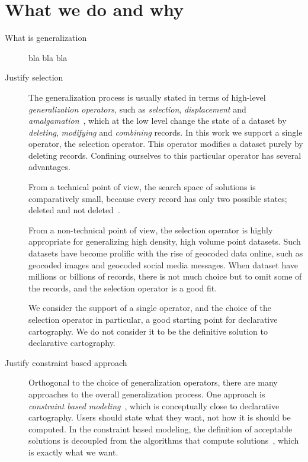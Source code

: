 \documentclass[11pt, oneside]{article}   	%
\begin{document}
\section{What we do and why}

\begin{description}


\item[What is generalization] bla bla bla

\item[Justify selection] The generalization process is usually stated in terms of high-level \emph{generalization operators}, such as \emph{selection}, \emph{displacement} and \emph{amalgamation}~\cite{weibel1999generalising}, which at the low level change the state of a dataset by \emph{deleting}, \emph{modifying} and \emph{combining} records. In this work we support a single operator, the selection operator. This operator modifies a dataset purely by deleting records. Confining ourselves to this particular operator has several advantages. 

From a technical point of view, the search space of solutions is comparatively small,  because every record has only two possible states; deleted and not deleted~\cite{harrie2007modelling}.

From a non-technical point of view, the selection operator is highly appropriate for generalizing high density, high volume point datasets. Such datasets have become prolific with the rise of geocoded data online, such as geocoded images and geocoded social media messages. When dataset have millions or billions of records, there is not much choice but to omit some of the records, and the selection operator is a good fit.

We consider the support of a single operator, and the choice of the selection operator in particular, a good starting point for declarative cartography. We do not consider it to be the definitive solution to declarative cartography.

\item[Justify constraint based approach] Orthogonal to the choice of generalization operators, there are many approaches to the overall generalization process. One approach is \emph{constraint based modeling}~\cite{harrie1999constraint}, which is conceptually close to declarative cartography. Users should state what they want, not how it is should be computed. In the constraint based modeling, the definition of acceptable solutions is decoupled from the algorithms that compute solutions~\cite{beard1991constraints}, which is exactly what we want. 


\end{description}
\end{document}
